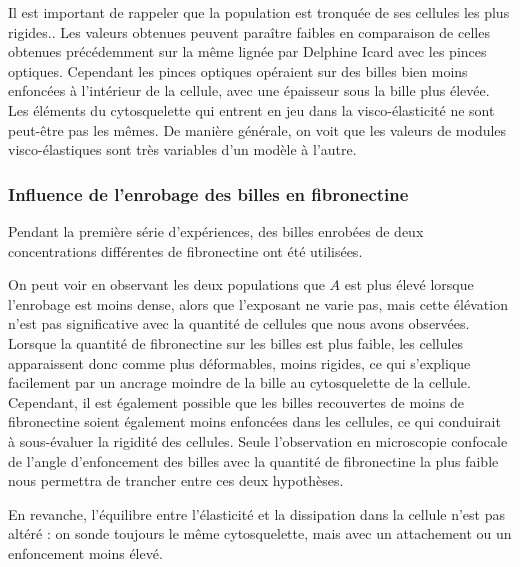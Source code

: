   
Il est important de rappeler que la population est tronquée de ses cellules les plus rigides.. 
Les valeurs obtenues peuvent paraître faibles en comparaison de celles obtenues précédemment sur la même lignée par Delphine Icard avec les pinces optiques. Cependant les pinces optiques opéraient sur des billes bien moins enfoncées à l'intérieur de la cellule, avec une épaisseur sous la bille plus élevée. Les éléments du cytosquelette qui entrent en jeu dans la visco-élasticité ne sont peut-être pas les mêmes. De manière générale, on voit que les valeurs de modules visco-élastiques sont très variables d'un modèle à l'autre. 

\subsubsection{Influence de l'enrobage des billes en fibronectine}

Pendant la première série d'expériences, des billes enrobées de deux concentrations différentes de fibronectine ont été utilisées. 

On peut voir en observant les deux populations que $A$ est plus élevé lorsque l'enrobage est moins dense, alors que l'exposant ne varie pas, mais cette élévation n'est pas significative avec la quantité de cellules que nous avons observées.
Lorsque la quantité de fibronectine sur les billes est plus faible, les cellules apparaissent donc comme plus déformables, moins rigides, ce qui s'explique facilement par un ancrage moindre de la bille au cytosquelette de la cellule.  Cependant, il est également possible que les billes recouvertes de moins de fibronectine soient également moins enfoncées dans les cellules, ce qui conduirait à sous-évaluer la rigidité des cellules. Seule l'observation en microscopie confocale de l'angle d'enfoncement des billes avec la quantité de fibronectine la plus faible nous permettra de trancher entre ces deux hypothèses. 

En revanche, l'équilibre entre l'élasticité et la dissipation dans la cellule n'est pas altéré : on sonde toujours le même cytosquelette, mais avec un attachement ou un enfoncement moins élevé. 

